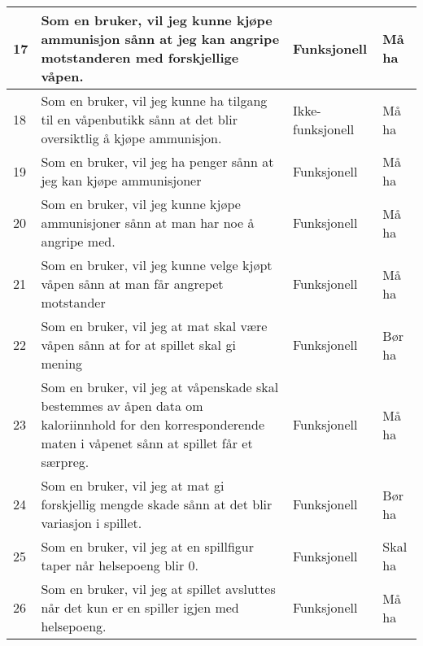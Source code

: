 \begin{longtable}{ | p{1cm} | p{6cm} | p{2.5cm} | p{2cm} |}
17&Som en bruker, vil jeg kunne kjøpe ammunisjon sånn at jeg kan angripe motstanderen med forskjellige våpen.&Funksjonell&Må ha\\ \hline
18&Som en bruker, vil jeg kunne ha tilgang til en våpenbutikk sånn at det blir oversiktlig å kjøpe ammunisjon.&Ikke-funksjonell&Må ha\\ \hline
19&Som en bruker, vil jeg ha penger sånn at jeg kan kjøpe ammunisjoner&Funksjonell&Må ha\\ \hline
20&Som en bruker, vil jeg kunne kjøpe ammunisjoner sånn at man har noe å angripe med.&Funksjonell&Må ha\\ \hline
21&Som en bruker, vil jeg kunne velge kjøpt våpen sånn at man får angrepet motstander&Funksjonell&Må ha\\ \hline
22&Som en bruker, vil jeg at mat skal være våpen sånn at for at spillet skal gi mening&Funksjonell&Bør ha\\ \hline
23&Som en bruker, vil jeg at våpenskade skal bestemmes av åpen data om kaloriinnhold for den korresponderende maten i våpenet sånn at spillet får et særpreg.&Funksjonell&Må ha\\ \hline
24&Som en bruker, vil jeg at mat gi forskjellig mengde skade sånn at det blir variasjon i spillet.&Funksjonell&Bør ha\\ \hline
25&Som en bruker, vil jeg at en spillfigur taper når helsepoeng blir 0.&Funksjonell&Skal ha\\ \hline
26&Som en bruker, vil jeg at spillet avsluttes når det kun er en spiller igjen med helsepoeng.&Funksjonell&Må ha\\ \hline

\end{longtable}